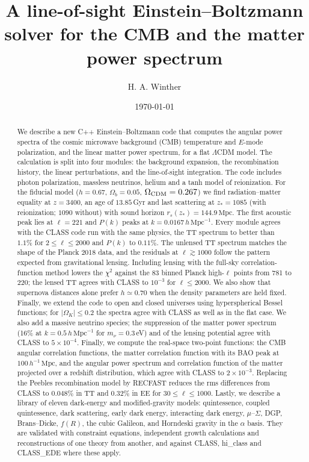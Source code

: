 \documentclass[aps,prd,twocolumn,nofootinbib,superscriptaddress,floatfix]{revtex4-2}
\newcommand{\Mpc}{\,\mathrm{Mpc}}
\newcommand{\hMpc}{\,h\,\mathrm{Mpc}^{-1}}
\newcommand{\Om}{\Omega}
\begin{document}
\title{A line-of-sight Einstein--Boltzmann solver for the CMB and the matter power spectrum}

\author{H. A. Winther}

\date{\today}

\begin{abstract}
We describe a new C++ Einstein--Boltzmann code that computes the angular power spectra of the cosmic microwave
background (CMB) temperature and $E$-mode polarization, and the linear matter power spectrum, for a flat
$\Lambda$CDM model. The calculation is split into four modules: the background expansion, the recombination
history, the linear perturbations, and the line-of-sight integration. The code includes photon polarization, massless
neutrinos, helium and a tanh model of reionization. For the fiducial model ($h=0.67$, $\Om_{b}=0.05$,
$\Om_{\rm CDM}=0.267$) we find radiation--matter equality at $z=3400$, an age of $13.85$\,Gyr and last scattering
at $z_*=1085$ (with reionization; $1090$ without) with sound horizon $r_s(z_*)=144.9\Mpc$. The first acoustic peak
lies at $\ell=221$ and $P(k)$ peaks at $k=0.0167\hMpc$. Every module agrees with the CLASS code run with the same
physics, the TT spectrum to better than $1.1\%$ for $2\le\ell\le2000$ and $P(k)$ to $0.11\%$. The unlensed TT spectrum
matches the shape of the Planck 2018 data, and the residuals at $\ell\gtrsim 1000$ follow the pattern expected from
gravitational lensing. Including lensing with the full-sky correlation-function method lowers the $\chi^2$ against
the 83 binned Planck high-$\ell$ points from 781 to 220; the lensed TT agrees with CLASS to $10^{-3}$ for $\ell\le2000$. We also show that supernova distances alone prefer
$h\simeq0.70$ when the density parameters are held fixed. Finally, we extend the code to open and closed universes
using hyperspherical Bessel functions; for $|\Om_K|\le0.2$ the spectra agree with CLASS as well as in the flat case.
We also add a massive neutrino species; the suppression of the matter power spectrum (16\% at $k=0.5\hMpc$ for
$m_\nu=0.3$\,eV) and of the lensing potential agree with CLASS to $5\times10^{-4}$. Finally, we compute the real-space two-point
functions: the CMB angular correlation functions, the matter correlation function with its BAO peak at
$100\,h^{-1}\Mpc$, and the angular power spectrum and correlation function of the matter projected over a redshift
distribution, which agree with CLASS to $2\times10^{-3}$. Replacing the Peebles recombination model by RECFAST
reduces the rms differences from CLASS to 0.048\% in TT and
0.32\% in EE for $30\le\ell\le1000$. Lastly, we describe a library of eleven
dark-energy and modified-gravity models: quintessence, coupled quintessence, dark scattering, early dark energy,
interacting dark energy, $\mu$--$\Sigma$, DGP, Brans--Dicke, $f(R)$, the cubic Galileon, and Horndeski gravity in the
$\alpha$ basis. They are validated with constraint equations, independent growth calculations and reconstructions of
one theory from another, and against CLASS, hi\_class and CLASS\_EDE where these apply.
\end{abstract}
\end{document}
